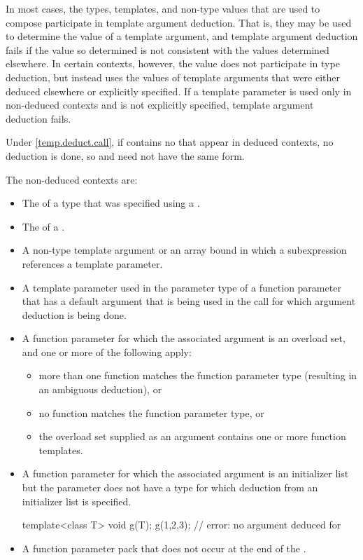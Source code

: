 \pnum
In most cases, the types, templates, and non-type values that are used
to compose
participate in template argument deduction.
That is,
they may be used to determine the value of a template argument, and
template argument deduction fails if
the value so determined is not consistent with the values determined
elsewhere.
In certain contexts, however, the value does not
participate in type deduction, but instead uses the values of template
arguments that were either deduced elsewhere or explicitly specified.
If a template parameter is used only in non-deduced contexts and is not
explicitly specified, template argument deduction fails.
\begin{note}
Under \ref{temp.deduct.call},
if  contains no  that appear
in deduced contexts, no deduction is done, so  and 
need not have the same form.
\end{note}

\pnum
The non-deduced contexts are:

%
\begin{itemize}
\item
The
of a type that was specified using a
.
\item
The  of a .
\item
A non-type template argument or an array bound in which a subexpression
references a template parameter.
\item
A template parameter used in the parameter type of a function parameter that
has a default argument that is being used in the call for which argument
deduction is being done.
\item
A function parameter for which the associated argument is an
overload set, and one or more of the following apply:
\begin{itemize}
\item
more than one function matches the function parameter type (resulting in
an ambiguous deduction), or
\item
no function matches the function parameter type, or
\item
the overload set supplied as an argument contains one or more function templates.
\end{itemize}
\item A function parameter for which the associated argument is an initializer
list but the parameter does not have
a type for which deduction from an initializer list is specified.
\begin{example}
\begin{codeblock}
template<class T> void g(T);
g({1,2,3});                 // error: no argument deduced for 
\end{codeblock}
\end{example}
\item A function parameter pack that does not occur at the end of the
.
\end{itemize}

